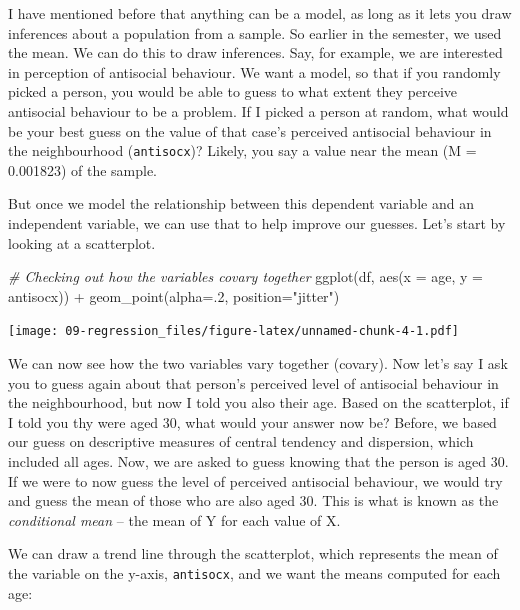 \documentclass[
]{book}
\newenvironment{Shaded}{\begin{snugshade}}{\end{snugshade}}
\newcommand{\AttributeTok}[1]{\textcolor[rgb]{0.77,0.63,0.00}{#1}}
\newcommand{\CommentTok}[1]{\textcolor[rgb]{0.56,0.35,0.01}{\textit{#1}}}
\newcommand{\DecValTok}[1]{\textcolor[rgb]{0.00,0.00,0.81}{#1}}
\newcommand{\FunctionTok}[1]{\textcolor[rgb]{0.00,0.00,0.00}{#1}}
\newcommand{\NormalTok}[1]{#1}
\newcommand{\SpecialCharTok}[1]{\textcolor[rgb]{0.00,0.00,0.00}{#1}}
\newcommand{\StringTok}[1]{\textcolor[rgb]{0.31,0.60,0.02}{#1}}
\begin{document}
I have mentioned before that anything can be a model, as long as it lets you draw inferences about a population from a sample. So earlier in the semester, we used the mean. We can do this to draw inferences. Say, for example, we are interested in perception of antisocial behaviour. We want a model, so that if you randomly picked a person, you would be able to guess to what extent they perceive antisocial behaviour to be a problem. If I picked a person at random, what would be your best guess on the value of that case's perceived antisocial behaviour in the neighbourhood (\texttt{antisocx})? Likely, you say a value near the mean (M = 0.001823) of the sample.

But once we model the relationship between this dependent variable and an independent variable, we can use that to help improve our guesses. Let's start by looking at a scatterplot.

\begin{Shaded}
\begin{Highlighting}[]
\CommentTok{\# Checking out how the variables covary together}
\FunctionTok{ggplot}\NormalTok{(df, }\FunctionTok{aes}\NormalTok{(}\AttributeTok{x =}\NormalTok{ age, }\AttributeTok{y =}\NormalTok{ antisocx)) }\SpecialCharTok{+} 
  \FunctionTok{geom\_point}\NormalTok{(}\AttributeTok{alpha=}\NormalTok{.}\DecValTok{2}\NormalTok{, }\AttributeTok{position=}\StringTok{"jitter"}\NormalTok{)}
\end{Highlighting}
\end{Shaded}

\texttt{[image: 09-regression\_files/figure-latex/unnamed-chunk-4-1.pdf]}

We can now see how the two variables vary together (covary). Now let's say I ask you to guess again about that person's perceived level of antisocial behaviour in the neighbourhood, but now I told you also their age. Based on the scatterplot, if I told you thy were aged 30, what would your answer now be? Before, we based our guess on descriptive measures of central tendency and dispersion, which included all ages. Now, we are asked to guess knowing that the person is aged 30. If we were to now guess the level of perceived antisocial behaviour, we would try and guess the mean of those who are also aged 30. This is what is known as the \emph{conditional mean} -- the mean of Y for each value of X.

We can draw a trend line through the scatterplot, which represents the mean of the variable on the y-axis, \texttt{antisocx}, and we want the means computed for each age:
\end{document}
